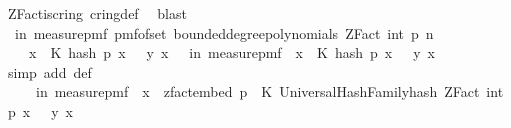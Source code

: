 \begin{isabellebody}
\ ZFact{\isacharunderscore}{\kern0pt}is{\isacharunderscore}{\kern0pt}cring\ cring{\isacharunderscore}{\kern0pt}def\ \isamarkupfalse%
\ blast\isanewline
\isanewline
\ \ \isamarkupfalse%
\ {\isachardoublequoteopen}{\isasymP}{\isacharparenleft}{\kern0pt}{\isasymomega}\ in\ measure{\isacharunderscore}{\kern0pt}pmf\ {\isacharparenleft}{\kern0pt}pmf{\isacharunderscore}{\kern0pt}of{\isacharunderscore}{\kern0pt}set\ {\isacharparenleft}{\kern0pt}bounded{\isacharunderscore}{\kern0pt}degree{\isacharunderscore}{\kern0pt}polynomials\ {\isacharparenleft}{\kern0pt}ZFact\ {\isacharparenleft}{\kern0pt}int\ p{\isacharparenright}{\kern0pt}{\isacharparenright}{\kern0pt}\ n{\isacharparenright}{\kern0pt}{\isacharparenright}{\kern0pt}{\isachardot}{\kern0pt}\ \isanewline
\ \ \ \ {\isacharparenleft}{\kern0pt}{\isasymforall}x\ {\isasymin}\ K{\isachardot}{\kern0pt}\ hash\ p\ x\ {\isasymomega}\ {\isacharequal}{\kern0pt}\ {\isacharparenleft}{\kern0pt}y\ x{\isacharparenright}{\kern0pt}{\isacharparenright}{\kern0pt}{\isacharparenright}{\kern0pt}\ {\isacharequal}{\kern0pt}\ {\isasymP}{\isacharparenleft}{\kern0pt}{\isasymomega}\ in\ measure{\isacharunderscore}{\kern0pt}pmf\ {\isasymOmega}{\isachardot}{\kern0pt}\ {\isacharparenleft}{\kern0pt}{\isasymforall}x\ {\isasymin}\ K{\isachardot}{\kern0pt}\ hash\ p\ x\ {\isasymomega}\ {\isacharequal}{\kern0pt}\ {\isacharparenleft}{\kern0pt}y\ x{\isacharparenright}{\kern0pt}{\isacharparenright}{\kern0pt}{\isacharparenright}{\kern0pt}{\isachardoublequoteclose}\isanewline
\ \ \ \ \isamarkupfalse%
\ {\isacharparenleft}{\kern0pt}simp\ add{\isacharcolon}{\kern0pt}\ {\isasymOmega}{\isacharunderscore}{\kern0pt}def{\isacharparenright}{\kern0pt}\isanewline
\ \ \isamarkupfalse%
\ \isamarkupfalse%
\ {\isachardoublequoteopen}{\isachardot}{\kern0pt}{\isachardot}{\kern0pt}{\isachardot}{\kern0pt}\ {\isacharequal}{\kern0pt}\isanewline
\ \ \ \ {\isasymP}{\isacharparenleft}{\kern0pt}{\isasymomega}\ in\ measure{\isacharunderscore}{\kern0pt}pmf\ {\isasymOmega}{\isachardot}{\kern0pt}\ {\isacharparenleft}{\kern0pt}{\isasymforall}x\ {\isasymin}\ zfact{\isacharunderscore}{\kern0pt}embed\ p\ {\isacharbackquote}{\kern0pt}\ K{\isachardot}{\kern0pt}\ UniversalHashFamily{\isachardot}{\kern0pt}hash\ {\isacharparenleft}{\kern0pt}ZFact\ {\isacharparenleft}{\kern0pt}int\ p{\isacharparenright}{\kern0pt}{\isacharparenright}{\kern0pt}\ x\ {\isasymomega}\ {\isacharequal}{\kern0pt}\ y{\isacharprime}{\kern0pt}\ x{\isacharparenright}{\kern0pt}{\isacharparenright}{\kern0pt}{\isachardoublequoteclose}\isanewline

\end{isabellebody}
